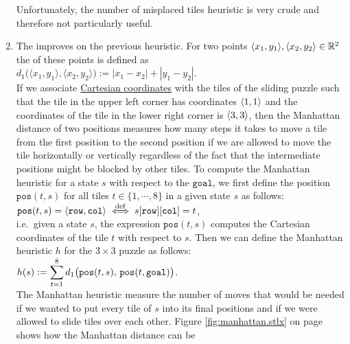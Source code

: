 \begin{enumerate}
      Unfortunately, the number of misplaced tiles heuristic is very crude and therefore not
      particularly useful.
\item The  improves on the previous heuristic.  For two points 
      $\pair(x_1, y_1), \pair(x_2, y_2) \in \mathbb{R}^2$ the  of these
      points is defined as 
      \\[0.2cm]
      \hspace*{1.3cm}
      $d_1\bigl(\langle x_1, y_1\rangle, \langle x_2, y_2\rangle\bigr) := |x_1 - x_2| + |y_1 - y_2|$.
      \\[0.2cm]
      If we associate \href{https://en.wikipedia.org/wiki/Cartesian_coordinate_system}{Cartesian coordinates} with
      the tiles of the sliding puzzle such that the tile in the upper left corner has coordinates
      $\pair(1, 1)$ and the coordinates of the tile in the lower right corner is $\pair(3, 3)$, then
      the Manhattan distance of two positions measures how many steps it takes to move a tile from
      the first position to the second position if we are allowed to move the tile horizontally
      or vertically regardless of the fact that the intermediate positions might be blocked by
      other tiles.  To compute the Manhattan heuristic for a state $s$ with respect to the
      $\mathtt{goal}$, we first define the position $\mathtt{pos}(t, s)$ for all tiles 
      $t \in \{1,\cdots, 8\}$ in a given state $s$ as follows:
      \\[0.2cm]
      \hspace*{1.3cm}
      $\mathtt{pos}(t, s) = \pair(\mathtt{row}, \mathtt{col}) 
         \;\stackrel{\mathrm{def}}{\Longleftrightarrow}\; s[\mathtt{row}][\mathtt{col}] = t
      $,
      \\[0.2cm]
      i.e.~given a state $s$, the expression $\mathtt{pos}(t, s)$ computes the Cartesian coordinates of
      the tile $t$ with respect to $s$.  Then we can define the Manhattan heuristic $h$ for the $3 \times 3$ puzzle
      as follows:  
      \\[0.2cm]
      \hspace*{1.3cm}
      $\displaystyle h(s) := \sum\limits_{t=1}^8 d_1\bigl(\mathtt{pos}(t,s),\, \mathtt{pos}(t, \mathtt{goal})\bigr)$.
      \\[0.2cm]
      The Manhattan heuristic measure the number of moves that would be needed if we wanted to put every tile
      of $s$ into its final positions and if we were allowed to slide tiles over each other.  Figure
      \ref{fig:manhattan.stlx} on page \pageref{fig:manhattan.stlx} shows how the Manhattan distance can be

\end{enumerate}
